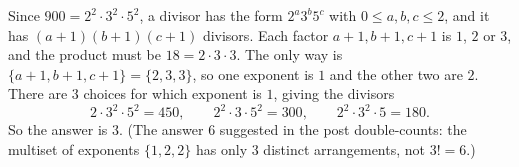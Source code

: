 Since $900=2^2\cdot3^2\cdot5^2$, a divisor has the form $2^a3^b5^c$ with $0\le a,b,c\le2$, and it has $(a+1)(b+1)(c+1)$ divisors. Each factor $a+1,b+1,c+1$ is $1$, $2$ or $3$, and the product must be $18=2\cdot3\cdot3$. The only way is $\{a+1,b+1,c+1\}=\{2,3,3\}$, so one exponent is $1$ and the other two are $2$. There are $3$ choices for which exponent is $1$, giving the divisors
\[
2\cdot3^2\cdot5^2=450,\qquad 2^2\cdot3\cdot5^2=300,\qquad 2^2\cdot3^2\cdot5=180 .
\]
So the answer is $\boxed{3}$. (The answer $6$ suggested in the post double-counts: the multiset of exponents $\{1,2,2\}$ has only $3$ distinct arrangements, not $3!=6$.)
